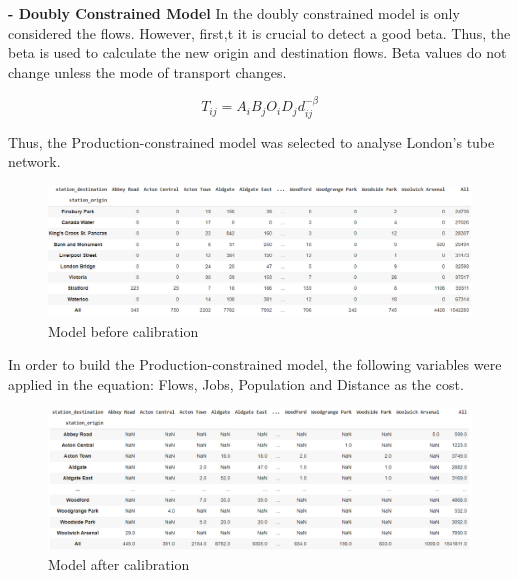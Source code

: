 \documentclass[10pt]{report}
\numberwithin{figure}{section}
\numberwithin{table}{section}
\begin{document}
\vspace{5mm} %
\textbf{- Doubly Constrained Model}
 In the doubly constrained model is only considered the flows. However, first,t it is crucial to detect a good beta. Thus, the beta is used to calculate the new origin and destination flows. Beta values do not change unless the mode of transport changes. 

\begin{equation} \tag{4}
T_{ij} = A_i B_j O_i D_j d_{ij}^{-\beta}
\end{equation}

\vspace{5mm} %

Thus, the Production-constrained model was selected to analyse London's tube network. 

    \begin{figure}[htp]
        \centering
        \includegraphics[width=16cm]{Image/Part2_OD.png}
        \caption{Model before calibration}
        \label{fig: Model before calibration}
    \end{figure}

In order to build the Production-constrained model, the following variables were applied in the equation: Flows, Jobs, Population and Distance as the cost. 

    \begin{figure}[htp]
        \centering
        \includegraphics[width=16cm]{Image/Part2_OD2.png}
        \caption{Model after calibration}
        \label{fig: Model after calibration}
    \end{figure}

\newpage    
\end{document}
